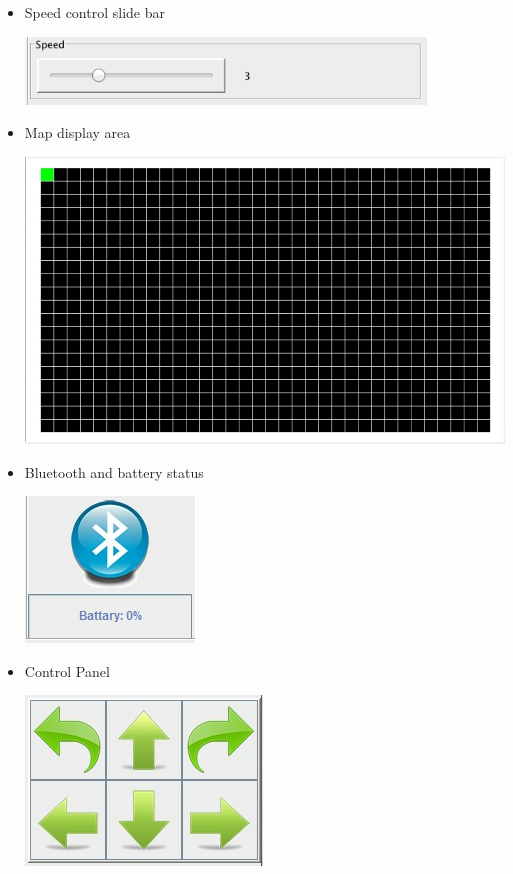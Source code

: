 \documentclass[11pt, a4paper]{report}
\begin{document}
\begin{itemize}

	\item Speed control slide bar
	\begin{center}
	\includegraphics[scale=1]{./image/speed.png}\\[1cm]
	\end{center}
	\item Map display area
	\begin{center}
	\includegraphics[scale=0.7]{./image/MapArea.png}\\[1cm]
	\end{center}
	\item Bluetooth and battery status
	\begin{center}
	\includegraphics[scale=0.7]{./image/Bluetooth&Battery.png}\\[1cm]
	\end{center}
	\item Control Panel
	\begin{center}
	\includegraphics[scale=0.7]{./image/ControlPanel.png}\\[1cm]

\end{center}
\end{itemize}
\end{document}
